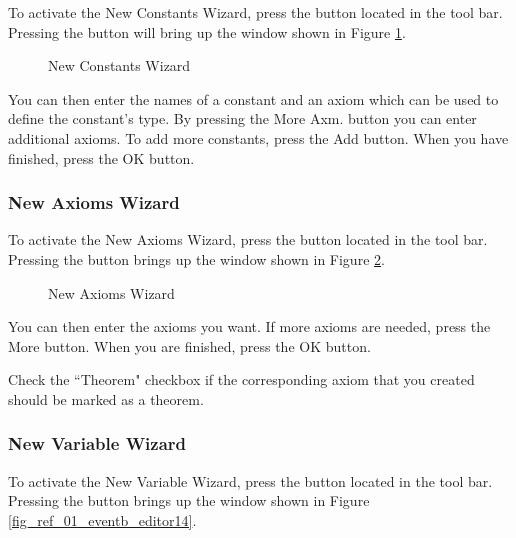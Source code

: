 To activate the \textsf{New Constants Wizard}, press the  button located in the tool bar. Pressing the button will bring up the window shown in Figure \ref{fig_ref_01_eventb_editor6}.

\begin{figure}[!ht]
\begin{center}
	\caption{New Constants Wizard}
	\label{fig_ref_01_eventb_editor6}
\end{center}
\end{figure}

You can then enter the names of a constant and an axiom which can be used to define the constant's type. By pressing the \textsf{More Axm.} button you can enter additional axioms. To add more constants, press the \textsf{Add} button. When you have finished, press the \textsf{OK} button.

\subsubsection{New Axioms Wizard}

To activate the \textsf{New Axioms Wizard}, press the  button located in the tool bar. Pressing the button brings up the window shown in Figure \ref{fig_ref_01_eventb_editor7}.

\begin{figure}[!ht]
\begin{center}
	\caption{New Axioms Wizard}
	\label{fig_ref_01_eventb_editor7}
\end{center}
\end{figure}

You can then enter the axioms you want. If more axioms are needed, press the \textsf{More} button. When you are finished, press the \textsf{OK} button.

Check the ``Theorem" checkbox if the corresponding axiom that you created should be marked as a theorem.

\subsubsection{New Variable Wizard}

To activate the \textsf{New Variable Wizard}, press the  button located in the tool bar. Pressing the button brings up the window shown in Figure \ref{fig_ref_01_eventb_editor14}.

